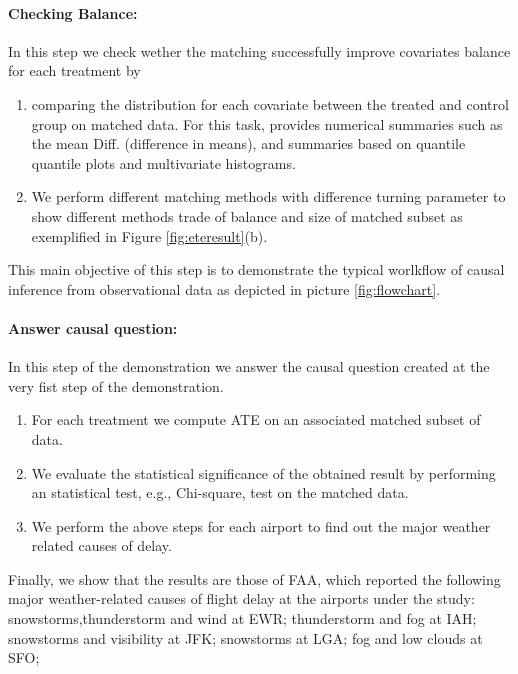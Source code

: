 \paragraph{\bf Checking Balance:}  In this step we check wether the matching successfully improve covariates balance for each treatment by
    \begin{enumerate}
      \item comparing the distribution for each covariate between the treated and control group on matched data. For this task, \GSQL provides numerical summaries such as the mean Diff. (difference in means), and summaries based on quantile quantile plots and multivariate histograms.

      \item We perform different matching methods with difference turning parameter to show different methods trade of balance and size of matched subset as exemplified in Figure \ref{fig:eteresult}(b).
       \end{enumerate}
      This main objective of this step is to demonstrate the typical worlkflow of causal inference from observational data as depicted in picture \ref{fig:flowchart}.

     \paragraph{\bf Answer causal question:} In this step of the demonstration we answer the causal question created at the very fist step of the demonstration.

       \begin{enumerate}
       \item For each treatment we compute ATE on an associated matched subset of data.
      \item We evaluate the statistical significance of the obtained result by performing an statistical test, e.g., Chi-square, test on the matched data.
    \item We perform the above steps for each airport to find out the major weather related causes of delay.  
    \end{enumerate}

Finally, we show that the results are those of
FAA, which reported the following major weather-related
causes of flight delay at the airports under the study:
snowstorms,thunderstorm and wind at EWR; thunderstorm and fog at IAH;
snowstorms and visibility at JFK; snowstorms at LGA; fog and low
clouds at SFO;




